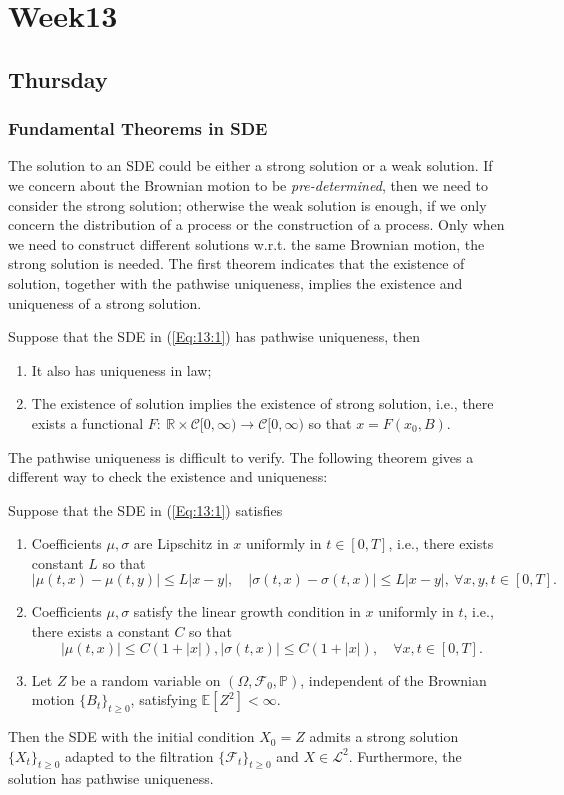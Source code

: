 \chapter{Week13}
\section{Thursday}
\subsection{Fundamental Theorems in SDE}
The solution to an SDE could be either a strong solution or a weak solution.
If we concern about the Brownian motion to be \emph{pre-determined}, then we need to consider the strong solution; otherwise the weak solution is enough, if we only concern the distribution of a process or the construction of a process.
Only when we need to construct different solutions w.r.t. the same Brownian motion, the strong solution is needed. The first theorem indicates that the existence of solution, together with the pathwise uniqueness, implies the existence and uniqueness of a strong solution.

\begin{theorem}
Suppose that the SDE in (\eqref{Eq:13:1}) has pathwise uniqueness, then
\begin{enumerate}
\item
It also has uniqueness in law;
\item
The existence of solution implies the existence of strong solution, i.e., there exists a functional $F:~\mathbb{R}\times\mathcal{C}[0,\infty)\to\mathcal{C}[0,\infty)$ so that $x=F(x_0,B)$.
\end{enumerate}
\end{theorem}

The pathwise uniqueness is difficult to verify. The following theorem gives a different way to check the existence and uniqueness:

\begin{theorem}
Suppose that the SDE in (\eqref{Eq:13:1}) satisfies
\begin{enumerate}
\item
Coefficients $\mu,\sigma$ are Lipschitz in $x$ uniformly in $t\in[0,T]$, i.e., there exists constant $L$ so that 
\[
|\mu(t,x) - \mu(t,y)|\le L|x-y|,\quad
|\sigma(t,x) - \sigma(t,x)|\le L|x-y|,~\forall x,y, t\in[0,T].
\]
\item
Coefficients $\mu,\sigma$ satisfy the linear growth condition in $x$ uniformly in $t$, i.e., there exists a constant $C$ so that
\[
|\mu(t,x)|\le C(1+|x|), |\sigma(t,x)|\le C(1+|x|),\quad \forall x, t\in[0,T].
\]
\item
Let $Z$ be a random variable on $(\Omega,\mathcal{F}_0,\mathbb{P})$, independent of the Brownian motion $\{B_t\}_{t\ge0}$, satisfying $\mathbb{E}[Z^2]<\infty$.
\end{enumerate}
Then the SDE with the initial condition $X_0=Z$ admits a strong solution $\{X_t\}_{t\ge0}$ adapted to the filtration $\{\mathcal{F}_t\}_{t\ge0}$ and $X\in\mathcal{L}^2$.
Furthermore, the solution has pathwise uniqueness.
\end{theorem}

